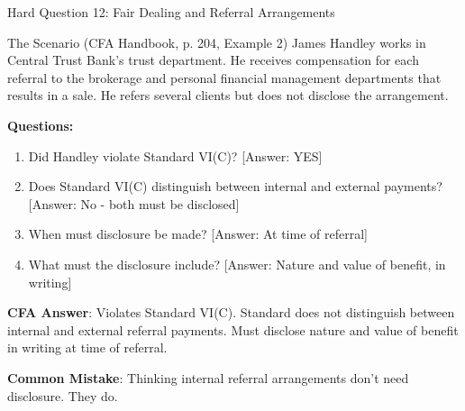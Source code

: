 \documentclass{beamer}
\begin{document}
	\begin{frame}{Hard Question 12: Fair Dealing and Referral Arrangements}
		\begin{block}{The Scenario (CFA Handbook, p. 204, Example 2)}
			James Handley works in Central Trust Bank's trust department. He receives compensation for each referral to the brokerage and personal financial management departments that results in a sale. He refers several clients but does not disclose the arrangement.
		\end{block}
		
		\vspace{0.2cm}
		\textbf{Questions:}
		\begin{enumerate}
			\item Did Handley violate Standard VI(C)? \textcolor{cfared}{[Answer: YES]}
			\item Does Standard VI(C) distinguish between internal and external payments? \textcolor{cfared}{[Answer: No - both must be disclosed]}
			\item When must disclosure be made? \textcolor{cfared}{[Answer: At time of referral]}
			\item What must the disclosure include? \textcolor{cfared}{[Answer: Nature and value of benefit, in writing]}
		\end{enumerate}
		
		\vspace{0.2cm}
		\textcolor{cfablue}{\textbf{CFA Answer}}: Violates Standard VI(C). Standard does not distinguish between internal and external referral payments. Must disclose nature and value of benefit in writing at time of referral.
		
		\vspace{0.1cm}
		\textcolor{cfared}{\textbf{Common Mistake}}: Thinking internal referral arrangements don't need disclosure. They do.
	\end{frame}
	
\end{document}
